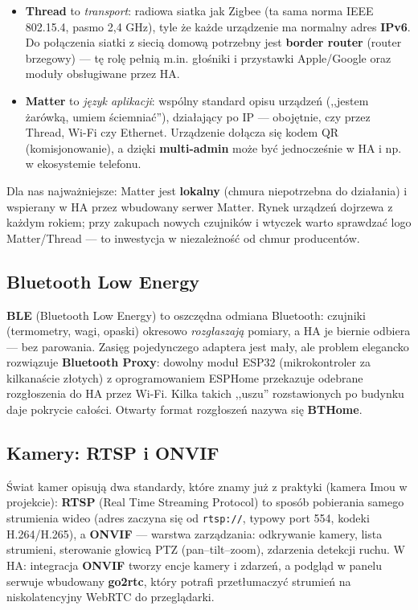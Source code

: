 \documentclass[11pt,a4paper]{article}
\begin{document}
\begin{itemize}
\item \textbf{Thread} to \emph{transport}: radiowa siatka jak Zigbee (ta sama norma IEEE 802.15.4, pasmo 2,4 GHz), tyle że każde urządzenie ma normalny adres \textbf{IPv6}. Do połączenia siatki z siecią domową potrzebny jest \textbf{border router} (router brzegowy) --- tę rolę pełnią m.in. głośniki i przystawki Apple/Google oraz moduły obsługiwane przez HA.
\item \textbf{Matter} to \emph{język aplikacji}: wspólny standard opisu urządzeń (,,jestem żarówką, umiem ściemniać''), działający po IP --- obojętnie, czy przez Thread, Wi-Fi czy Ethernet. Urządzenie dołącza się kodem QR (komisjonowanie), a dzięki \textbf{multi-admin} może być jednocześnie w HA i np. w ekosystemie telefonu.
\end{itemize}

Dla nas najważniejsze: Matter jest \textbf{lokalny} (chmura niepotrzebna do działania) i wspierany w HA przez wbudowany serwer Matter. Rynek urządzeń dojrzewa z każdym rokiem; przy zakupach nowych czujników i wtyczek warto sprawdzać logo Matter/Thread --- to inwestycja w niezależność od chmur producentów.

\subsection{Bluetooth Low Energy}
\label{sec:ble}

\textbf{BLE} (Bluetooth Low Energy) to oszczędna odmiana Bluetooth: czujniki (termometry, wagi, opaski) okresowo \emph{rozgłaszają} pomiary, a HA je biernie odbiera --- bez parowania. Zasięg pojedynczego adaptera jest mały, ale problem elegancko rozwiązuje \textbf{Bluetooth Proxy}: dowolny moduł ESP32 (mikrokontroler za kilkanaście złotych) z oprogramowaniem ESPHome przekazuje odebrane rozgłoszenia do HA przez Wi-Fi. Kilka takich ,,uszu'' rozstawionych po budynku daje pokrycie całości. Otwarty format rozgłoszeń nazywa się \textbf{BTHome}.

\subsection{Kamery: RTSP i ONVIF}

Świat kamer opisują dwa standardy, które znamy już z praktyki (kamera Imou w projekcie): \textbf{RTSP} (Real Time Streaming Protocol) to sposób pobierania samego strumienia wideo (adres zaczyna się od \texttt{rtsp://}, typowy port 554, kodeki H.264/H.265), a \textbf{ONVIF} --- warstwa zarządzania: odkrywanie kamery, lista strumieni, sterowanie głowicą PTZ (pan--tilt--zoom), zdarzenia detekcji ruchu. W HA: integracja \textbf{ONVIF} tworzy encje kamery i zdarzeń, a podgląd w panelu serwuje wbudowany \textbf{go2rtc}, który potrafi przetłumaczyć strumień na niskolatencyjny WebRTC do przeglądarki.
\end{document}
